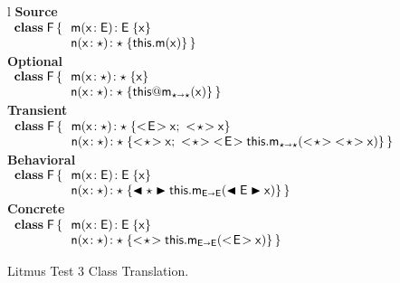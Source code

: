 \documentclass[a4paper,USenglish]{tex/lipics-v2016}
\begin{document}
\begin{figure}[!h]
  \begin{tabular}{l}
    {\scriptsize\bf{Source}} \\
\(
\begin{array}{l@{\,}l}
\Class{\xt F}{}{&\Mdef\m\x{\xt E}{\xt E}\x \\
                &\Mdef\n\x\any\any{\Call\this\m\x}} \\
\end{array}
\) \\
    {\scriptsize\bf{Optional}} \\ 
\(
\begin{array}{l@{\,}l}
\Class{\xt F}{}{&\Mdef\m\x{\any}{\any}\x \\
                &\Mdef\n\x\any\any{\DynCall\this\m\x}} \\
\end{array}
\) \\
    {\scriptsize\bf{Transient}} \\
\(
\begin{array}{l@{\,}l}
\Class{\xt F}{}{&\Mdef\m\x\any\any{\SubCast{\xt E}{\x}; ~ \SubCast{\any}{\x} } \\
                &\Mdef\n\x\any\any{\SubCast{\any}{\x}\sspce 
                \SubCast{\any}{\SubCast{\xt E}{\KCall\this\m{\SubCast\any{\SubCast\any\x}}\any\any}}}} \\
\end{array}
\)\\
    {\scriptsize\bf{Behavioral}} \\
\(
\begin{array}{l@{\,}l}
\Class{\xt F}{}{&\Mdef\m\x{\xt E}{\xt E}\x \\
                &\Mdef\n\x\any\any{\BehCast\any{\KCall\this\m{\BehCast{\xt E}\x}{\xt E}{\xt E}}}} \\
\end{array}
\) \\
    {\scriptsize\bf{Concrete}} \\
\(
\begin{array}{l@{\,}l}
\Class{\xt F}{}{&\Mdef\m\x{\xt E}{\xt E}\x \\
                &\Mdef\n\x\any\any{\SubCast\any{\KCall\this\m{\SubCast{\xt E}\x}{\xt E}{\xt E}}}} \\
\end{array}
\) \\
  \end{tabular}
  
 \caption{Litmus Test 3 Class Translation.} \label{fig:l3trans}
\end{figure}
\end{document}
